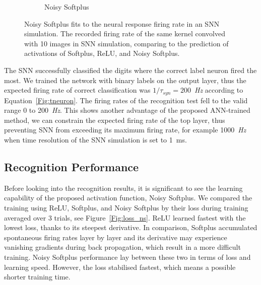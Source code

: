 \documentclass{article}
\begin{document}
\begin{figure}[hb!]
\begin{subfigure}[hb]{0.32\textwidth}
		\caption{Noisy Softplus}
	\end{subfigure}
		\caption{Noisy Softplus fits to the neural response firing rate in an SNN simulation.
			The recorded firing rate of the same kernel convolved with 10 images in SNN simulation, comparing to the prediction of activations of Softplus, ReLU, and Noisy Softplus.}
		\label{fig:af_compare}
\end{figure}		

The SNN successfully classified the digits where the correct label neuron fired the most.
We trained the network with binary labels on the output layer, thus the expected firing rate of correct classification was $1/\tau_{syn}=200$~\textit{Hz} according to Equation~\ref{Fig:tneuron}.
The firing rates of the recognition test fell to the valid range 0 to 200~\textit{Hz}.
This shows another advantage of the proposed ANN-trained method, we can constrain the expected firing rate of the top layer, thus preventing SNN from exceeding its maximum firing rate, for example 1000~\textit{Hz} when time resolution of the SNN simulation is set to 1~ms.


\subsection{Recognition Performance}
\label{subsec:result_compare}
Before looking into the recognition results, it is significant to see the learning capability of the proposed activation function, Noisy Softplus.
We compared the training using ReLU, Softplus, and Noisy Softplus by their loss during training averaged over 3 trials, see Figure~\ref{Fig:loss_ns}.
ReLU learned fastest with the lowest loss, thanks to its steepest derivative.
In comparison, Softplus accumulated spontaneous firing rates layer by layer and its derivative may experience vanishing gradients during back propagation, which result in a more difficult training.
Noisy Softplus performance lay between these two in terms of loss and learning speed.
However, the loss stabilised fastest, which means a possible shorter training time.
\end{document}
